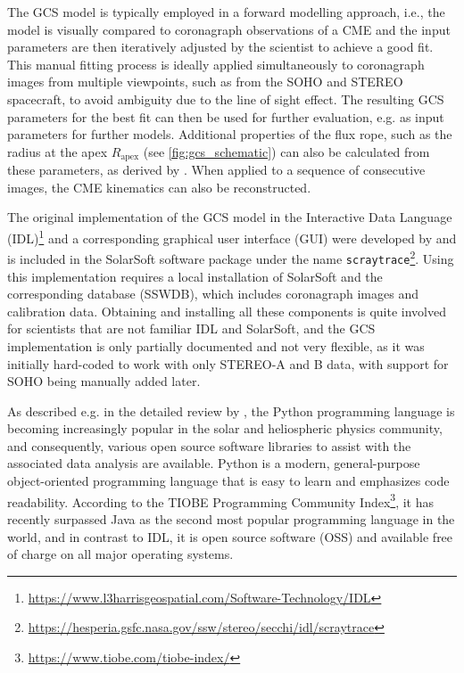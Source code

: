 The GCS model is typically employed in a forward modelling approach, i.e., the model is visually compared to coronagraph observations of a CME and the input parameters are then iteratively adjusted by the scientist to achieve a good fit. This manual fitting process is ideally applied simultaneously to coronagraph images from multiple viewpoints, such as from the SOHO and STEREO spacecraft, to avoid ambiguity due to the line of sight effect. The resulting GCS parameters for the best fit can then be used for further evaluation, e.g. as input parameters for further models. Additional properties of the flux rope, such as the radius at the apex $R_\text{apex}$ (see \autoref{fig:gcs_schematic}) can also be calculated from these parameters, as derived by \citep{Thernisien-2011-GCS}. When applied to a sequence of consecutive images, the CME kinematics can also be reconstructed.

The original implementation of the GCS model in the Interactive Data Language (IDL)\footnote{\url{https://www.l3harrisgeospatial.com/Software-Technology/IDL}} and a corresponding graphical user interface (GUI) were developed by \citet{Thernisien-2006-GCS} and is included in the SolarSoft software package \citep{Freeland-1998-SolarSoft} under the name \texttt{scraytrace}\footnote{\url{https://hesperia.gsfc.nasa.gov/ssw/stereo/secchi/idl/scraytrace}}.
Using this implementation requires a local installation of SolarSoft and the corresponding database (SSWDB), which includes coronagraph images and calibration data. Obtaining and installing all these components is quite involved for scientists that are not familiar IDL and SolarSoft, and the GCS implementation is only partially documented and not very flexible, as it was initially hard-coded to work with only STEREO-A and B data, with support for SOHO being manually added later.

As described e.g. in the detailed review by \citet{Burrell-2018}, the Python programming language is becoming increasingly popular in the solar and heliospheric physics community, and consequently, various open source software libraries to assist with the associated data analysis are available. Python is a modern, general-purpose object-oriented programming language that is easy to learn and emphasizes code readability. According to the TIOBE Programming Community Index\footnote{\url{https://www.tiobe.com/tiobe-index/}}, it has recently surpassed Java as the second most popular programming language in the world, and in contrast to IDL, it is open source software (OSS) and available free of charge on all major operating systems.

